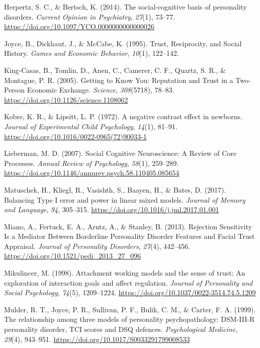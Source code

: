 \documentclass[
]{article}
\newlength{\cslhangindent}
\newenvironment{CSLReferences}[2] %
 {\begin{list}{}{%
  \setlength{\itemindent}{0pt}
  \setlength{\leftmargin}{0pt}
  \setlength{\parsep}{0pt}
  \ifodd #1
   \setlength{\leftmargin}{\cslhangindent}
   \setlength{\itemindent}{-1\cslhangindent}
  \fi
  \setlength{\itemsep}{#2\baselineskip}}}
 {\end{list}}
\begin{document}
\begin{CSLReferences}{1}{0}
Herpertz, S. C., \& Bertsch, K. (2014). The social-cognitive basis of personality disorders. \emph{Current Opinion in Psychiatry}, \emph{27}(1), 73--77. \url{https://doi.org/10.1097/YCO.0000000000000026}

Joyce, B., Dickhaut, J., \& McCabe, K. (1995). Trust, {Reciprocity}, and {Social History}. \emph{Games and Economic Behavior}, \emph{10}(1), 122--142.

King-Casas, B., Tomlin, D., Anen, C., Camerer, C. F., Quartz, S. R., \& Montague, P. R. (2005). Getting to {Know You}: {Reputation} and {Trust} in a {Two-Person Economic Exchange}. \emph{Science}, \emph{308}(5718), 78--83. \url{https://doi.org/10.1126/science.1108062}

Kobre, K. R., \& Lipsitt, L. P. (1972). A negative contrast effect in newborns. \emph{Journal of Experimental Child Psychology}, \emph{14}(1), 81--91. \url{https://doi.org/10.1016/0022-0965(72)90033-1}

Lieberman, M. D. (2007). Social {Cognitive Neuroscience}: {A Review} of {Core Processes}. \emph{Annual Review of Psychology}, \emph{58}(1), 259--289. \url{https://doi.org/10.1146/annurev.psych.58.110405.085654}

Matuschek, H., Kliegl, R., Vasishth, S., Baayen, H., \& Bates, D. (2017). Balancing {Type I} error and power in linear mixed models. \emph{Journal of Memory and Language}, \emph{94}, 305--315. \url{https://doi.org/10.1016/j.jml.2017.01.001}

Miano, A., Fertuck, E. A., Arntz, A., \& Stanley, B. (2013). Rejection {Sensitivity Is} a {Mediator Between Borderline Personality Disorder Features} and {Facial Trust Appraisal}. \emph{Journal of Personality Disorders}, \emph{27}(4), 442--456. \url{https://doi.org/10.1521/pedi_2013_27_096}

Mikulincer, M. (1998). Attachment working models and the sense of trust: {An} exploration of interaction goals and affect regulation. \emph{Journal of Personality and Social Psychology}, \emph{74}(5), 1209--1224. \url{https://doi.org/10.1037/0022-3514.74.5.1209}

Mulder, R. T., Joyce, P. R., Sullivan, P. F., Bulik, C. M., \& Carter, F. A. (1999). The relationship among three models of personality psychopathology: {DSM-III-R} personality disorder, {TCI} scores and {DSQ} defences. \emph{Psychological Medicine}, \emph{29}(4), 943--951. \url{https://doi.org/10.1017/S0033291799008533}


\end{CSLReferences}
\end{document}
